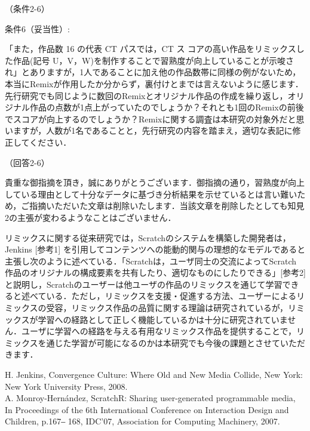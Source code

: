 \documentclass{jarticle} %
\def\subsection#1{ \vspace{1pc} {\gt #1} }
\begin{document}
\subsection{（条件2-6）}

条件6（妥当性）: 

「また，作品数 16 の代表 CT パスでは，CT ス コアの高い作品をリミックスした作品(記号 U，V，W)を制作することで習熟度が向上していることが示唆され」とありますが，1人であることに加え他の作品数帯に同様の例がないため，本当にRemixが作用したか分からず，裏付けとまでは言えないように感じます．先行研究でも同じように数回のRemixとオリジナル作品の作成を繰り返し，オリジナル作品の点数が1点上がっていたのでしょうか？それとも1回のRemixの前後でスコアが向上するのでしょうか？Remixに関する調査は本研究の対象外だと思いますが，人数が1名であることと，先行研究の内容を踏まえ，適切な表記に修正してください．

\subsection{（回答2-6）}

貴重な御指摘を頂き，誠にありがとうございます．御指摘の通り，習熟度が向上している理由として十分なデータに基づき分析結果を示せているとは言い難いため，ご指摘いただいた文章は削除いたします．当該文章を削除したとしても知見2の主張が変わるようなことはございません．

リミックスに関する従来研究では，Scratchのシステムを構築した開発者は，Jenkins [参考1] を引用してコンテンツへの能動的関与の理想的なモデルであると主張し次のように述べている．「Scratchは，ユーザ同士の交流によってScratch 作品のオリジナルの構成要素を共有したり、適切なものにしたりできる」[参考2] と説明し，Scratchのユーザーは他ユーザの作品のリミックスを通じて学習できると述べている．ただし，リミックスを支援・促進する方法、ユーザーによるリミックスの受容，リミックス作品の品質に関する理論は研究されているが，リミックスが学習への経路として正しく機能しているかは十分に研究されていません．ユーザに学習への経路を与える有用なリミックス作品を提供することで，リミックスを通じた学習が可能になるのかは本研究でも今後の課題とさせていただきます．

\noindent[参考1] H. Jenkins, Convergence Culture: Where Old and New Media Collide, New York: New York University Press, 2008.\\
\noindent[参考2] A. Monroy-Hern\'{a}ndez, ScratchR: Sharing user-generated programmable media,
In Proceedings of the 6th International Conference on Interaction Design and Children, p.167‒ 168, IDC'07, Association for Computing Machinery, 2007.
\end{document}
